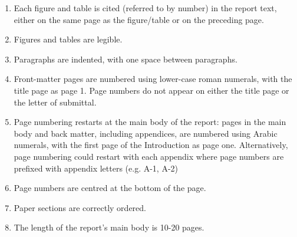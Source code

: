 \begin{enumerate}
\item \makebox[0pt][l]{$\square$}\raisebox{.15ex}{$\checkmark$}\hspace{2 mm}Each figure and table is cited (referred to by number) in the report text, either on the same page as the figure/table or on the preceding page.
\item \makebox[0pt][l]{$\square$}\raisebox{.15ex}{$\checkmark$}\hspace{2 mm}Figures and tables are legible.
\item \makebox[0pt][l]{$\square$}\raisebox{.15ex}{$\checkmark$}\hspace{2 mm}Paragraphs are indented, with one space between paragraphs.
\item \makebox[0pt][l]{$\square$}\raisebox{.15ex}{$\checkmark$}\hspace{2 mm}Front-matter pages are numbered using lower-case roman numerals, with the title page as page 1. Page numbers do not appear on either the title page or the letter of submittal.
\item \makebox[0pt][l]{$\square$}\raisebox{.15ex}{$\checkmark$}\hspace{2 mm}Page numbering restarts at the main body of the report: pages in the main body and back matter, including appendices, are numbered using Arabic numerals, with the first page of the Introduction as page one. Alternatively, page numbering could restart with each appendix where page numbers are prefixed with appendix letters (e.g. A-1, A-2)
\item \makebox[0pt][l]{$\square$}\raisebox{.15ex}{$\checkmark$}\hspace{2 mm}Page numbers are centred at the bottom of the page.
\item \makebox[0pt][l]{$\square$}\raisebox{.15ex}{$\checkmark$}\hspace{2 mm}Paper sections are correctly ordered.
\item \makebox[0pt][l]{$\square$}\raisebox{.15ex}{$\checkmark$}\hspace{2 mm}The length of the report's main body is 10-20 pages.
\end{enumerate}
